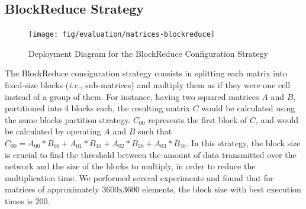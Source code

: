 \documentclass{article}
\begin{document}

\subsection{BlockReduce Strategy}

\begin{figure}[H]
	\centering
	\texttt{[image: fig/evaluation/matrices-blockreduce]}
	\caption[]{Deployment Diagram for the BlockReduce Configuration Strategy}
	\label{fig:apx-eval-amelia-blockreduce}
\end{figure}

The BlockReduce consiguration strategy consists in splitting each matrix into fixed-size blocks (\textit{i.e.}, sub-matrices) and multiply them as if they were one cell instead of a group of them. For instance, having two squared matrices $A$ and $B$, partitioned into 4 blocks each, the resulting matrix $C$ would be calculated using the same blocks partition strategy. $C_{00}$ represents the first block of $C$, and would be calculated by operating $A$ and $B$ such that $C_{00} = A_{00}*B_{00} + A_{01}*B_{10} + A_{02}*B_{20} + A_{03}*B_{30}$. In this strategy, the block size is crucial to find the threshold between the amount of data transmitted over the network and the size of the blocks to multiply, in order to reduce the multiplication time. We performed several experiments and found that for matrices of approximately 3600x3600 elements, the block size with best execution times is 200.
\end{document}
